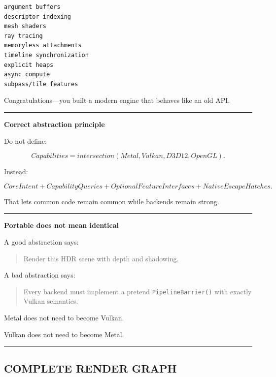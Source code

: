 \begin{verbatim}
argument buffers
descriptor indexing
mesh shaders
ray tracing
memoryless attachments
timeline synchronization
explicit heaps
async compute
subpass/tile features
\end{verbatim}

Congratulations---you built a modern engine that behaves like an old API.

\begin{center}\rule{0.5\linewidth}{0.5pt}\end{center}

\textbf{Correct abstraction principle}

Do not define:

\[
\boxed{
Capabilities=
intersection(
Metal,
Vulkan,
D3D12,
OpenGL).
}
\]

Instead:

\[
\boxed{
CoreIntent
+
CapabilityQueries
+
OptionalFeatureInterfaces
+
NativeEscapeHatches.
}
\]

That lets common code remain common while backends remain strong.

\begin{center}\rule{0.5\linewidth}{0.5pt}\end{center}

\textbf{Portable does not mean identical}

A good abstraction says:

\begin{quote}
Render this HDR scene with depth and shadowing.
\end{quote}

A bad abstraction says:

\begin{quote}
Every backend must implement a pretend \texttt{PipelineBarrier()} with exactly Vulkan semantics.
\end{quote}

Metal does not need to become Vulkan.

Vulkan does not need to become Metal.

\begin{center}\rule{0.5\linewidth}{0.5pt}\end{center}

\subsection{COMPLETE RENDER GRAPH}\label{06-engine-ii-ch043-complete-render-graph}

\hypertarget{06-engine-ii-ch043-complete-render-graph}{}

